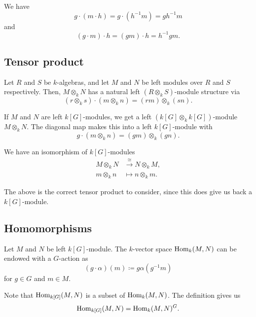 \documentclass[12pt]{article}
\begin{document}
We have
\begin{equation*} 
	g \cdot (m \cdot h) = g \cdot (h^{-1}m) = gh^{-1}m
\end{equation*}
and
\begin{equation*} 
	(g \cdot m) \cdot h = (gm) \cdot h = h^{-1}gm.
\end{equation*}

\subsection{Tensor product}

Let $R$ and $S$ be $k$-algebras, and let $M$ and $N$ be left modules over $R$ and $S$ respectively. 
Then, $M \otimes_{k} N$ has a natural left $(R \otimes_{k} S)$-module structure via
\begin{equation*} 
	(r \otimes_{k} s) \cdot (m \otimes_{k} n) = (rm) \otimes_{k} (sn).
\end{equation*}

If $M$ and $N$ are left $k[G]$-modules, we get a left $(k[G] \otimes_{k} k[G])$-module $M \otimes_{k} N$. 
The diagonal map makes this into a left $k[G]$-module with
\begin{equation*} 
	g \cdot (m \otimes_{k} n) = (gm) \otimes_{k} (gn).
\end{equation*}

We have an isomorphism of $k[G]$-modules 
\begin{align*} 
	M \otimes_{k} N &\xrightarrow{\cong} N \otimes_{k} M, \\
	m \otimes_{k} n &\mapsto n \otimes_{k} m.
\end{align*}

The above is the correct tensor product to consider, since this does give us back a $k[G]$-module.

\subsection{Homomorphisms} \label{subsec:Hom-group-algebra}

Let $M$ and $N$ be left $k[G]$-module. 
The $k$-vector space $\operatorname{Hom}_{k}(M, N)$ can be endowed with a $G$-action as
\begin{equation*} 
	(g \cdot \alpha)(m) \coloneqq g \alpha(g^{-1} m)
\end{equation*}
for $g \in G$ and $m \in M$.

Note that $\operatorname{Hom}_{k[G]}(M, N)$ is a subset of $\operatorname{Hom}_{k}(M, N)$. 
The definition gives us
\begin{equation*} 
	\operatorname{Hom}_{k[G]}(M, N) = \operatorname{Hom}_{k}(M, N)^{G}.
\end{equation*}
\end{document}
